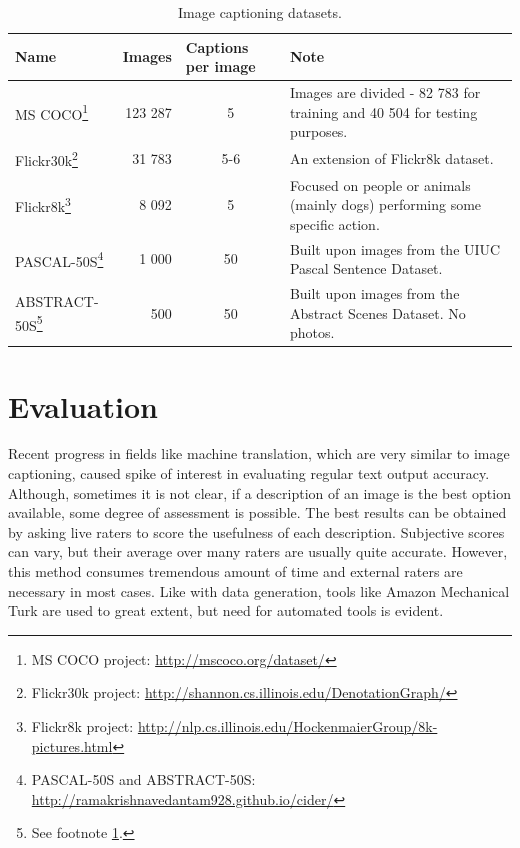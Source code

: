\begin{center}
	\begin{longtable}{|l|m{2cm}|m{2cm}|m{4.7cm}|}
		\caption{Image captioning datasets.} \label{tab:datasets} \\

	   	\hline
	   	\multicolumn{1}{|l|}{\textbf{Name}} &
	   	\textbf{Images} &
	   	\textbf{Captions per image} &
	   	\textbf{Note} \\
	   	\hline \hline
		\endhead

	   	MS COCO\footnote{MS COCO project: \url{http://mscoco.org/dataset/}} &
		   	\multicolumn{1}{r|}{123 287} &
		   	\multicolumn{1}{c|}{5} &
		   	Images are divided - 82 783 for training and 40 504 for testing purposes. \\ \hline
	   	Flickr30k\footnote{Flickr30k project: \url{http://shannon.cs.illinois.edu/DenotationGraph/}} &
		   	\multicolumn{1}{r|}{31 783} &
		   	\multicolumn{1}{c|}{5-6} &
		   	An extension of Flickr8k dataset. \\ \hline
	   	Flickr8k\footnote{Flickr8k project: \url{http://nlp.cs.illinois.edu/HockenmaierGroup/8k-pictures.html}} &
		   	\multicolumn{1}{r|}{8 092} &
		   	\multicolumn{1}{c|}{5} &
		   	Focused on people or animals (mainly dogs) performing some specific action. \\ \hline
	   	PASCAL-50S\footnote{\label{ft:cider}PASCAL-50S and ABSTRACT-50S: \url{http://ramakrishnavedantam928.github.io/cider/}} &
		   	\multicolumn{1}{r|}{1 000} &
		   	\multicolumn{1}{c|}{50} &
		   	Built upon images from the UIUC Pascal Sentence Dataset. \\ \hline
	   	ABSTRACT-50S\footnote{See footnote \ref{ft:cider}.} &
		   	\multicolumn{1}{r|}{500} &
		   	\multicolumn{1}{c|}{50} &
		   	Built upon images from the Abstract Scenes Dataset. No photos.\\ \hline
	\end{longtable}
\end{center}

\section{Evaluation}\label{sec:evaluation}

Recent progress in fields like machine translation, which are very similar to image captioning, caused spike of interest in evaluating regular text output accuracy. Although, sometimes it is not clear, if a description of an image is the best option available, some degree of assessment is possible. The best results can be obtained by asking live raters to score the usefulness of each description. Subjective scores can vary, but their average over many raters are usually quite accurate. However, this method consumes tremendous amount of time and external raters are necessary in most cases. Like with data generation, tools like Amazon Mechanical Turk are used to great extent, but need for automated tools is evident.

